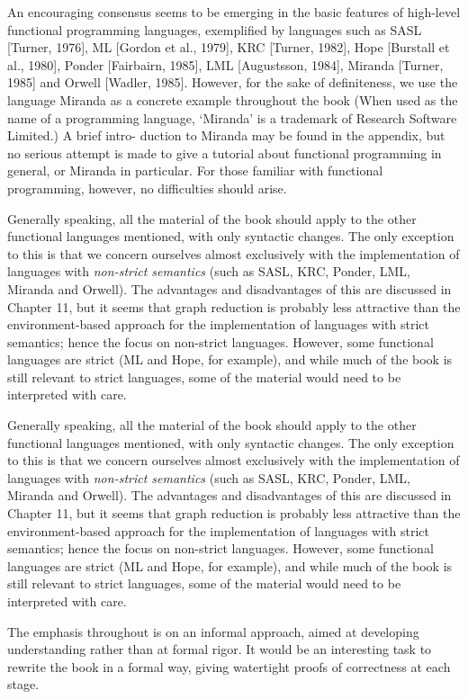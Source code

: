 An encouraging consensus seems to be emerging in the basic features of
high-level functional programming languages, exemplified by languages such
as SASL [Turner, 1976], ML [Gordon et al., 1979], KRC [Turner, 1982],
Hope [Burstall et al., 1980], Ponder [Fairbairn, 1985], LML [Augustsson,
1984], Miranda [Turner, 1985] and Orwell [Wadler, 1985]. However, for the
sake of definiteness, we use the language Miranda as a concrete example
throughout the book (When used as the name of a programming language,
`Miranda' is a trademark of Research Software Limited.) A brief intro-
duction to Miranda may be found in the appendix, but no serious attempt is
made to give a tutorial about functional programming in general, or Miranda
in particular. For those familiar with functional programming, however, no
difficulties should arise.

Generally speaking, all the material of the book should apply to the other
functional languages mentioned, with only syntactic changes. The only
exception to this is that we concern ourselves almost exclusively with the
implementation of languages with \textit{non-strict semantics} (such as SASL, KRC,
Ponder, LML, Miranda and Orwell). The advantages and disadvantages of
this are discussed in Chapter 11, but it seems that graph reduction is probably
less attractive than the environment-based approach for the implementation
of languages with strict semantics; hence the focus on non-strict languages.
However, some functional languages are strict (ML and Hope, for example),
and while much of the book is still relevant to strict languages, some of the
material would need to be interpreted with care.

Generally speaking, all the material of the book should apply to the other
functional languages mentioned, with only syntactic changes. The only
exception to this is that we concern ourselves almost exclusively with the
implementation of languages with \textit{non-strict semantics} (such as SASL, KRC,
Ponder, LML, Miranda and Orwell). The advantages and disadvantages of
this are discussed in Chapter 11, but it seems that graph reduction is probably
less attractive than the environment-based approach for the implementation
of languages with strict semantics; hence the focus on non-strict languages.
However, some functional languages are strict (ML and Hope, for example),
and while much of the book is still relevant to strict languages, some of the
material would need to be interpreted with care.

The emphasis throughout is on an informal approach, aimed at developing
understanding rather than at formal rigor. It would be an interesting task to
rewrite the book in a formal way, giving watertight proofs of correctness at
each stage.


